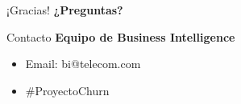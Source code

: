 \documentclass[11pt, aspectratio=169]{beamer}
\begin{document}
\begin{frame}{¡Gracias!}
    \centering
    \vspace{1cm}
    {\Huge \textbf{¿Preguntas?}}
    
    \vspace{1.5cm}
    \begin{block}{Contacto}
        \textbf{Equipo de Business Intelligence}
        \begin{itemize}
            \item Email: bi@telecom.com
            \item \#ProyectoChurn
        \end{itemize}
    \end{block}
\end{frame}

\end{document}
